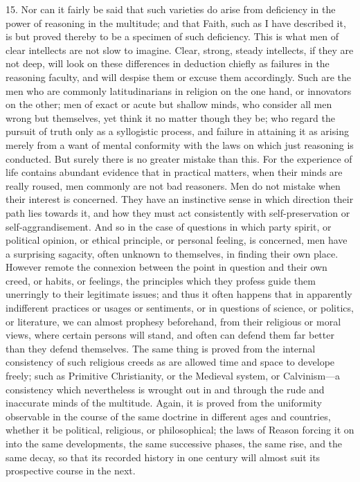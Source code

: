 15. Nor can it fairly be said that such varieties do arise from
deficiency in the power of reasoning in the multitude; and that Faith,
such as I have described it, is but proved thereby to be a specimen of
such deficiency. This is what men of clear intellects are not slow to
imagine. Clear, strong, steady intellects, if they are not deep, will
look on these differences in deduction chiefly as failures in the
reasoning faculty, and will despise them or excuse them accordingly.
Such are the men who are commonly latitudinarians in religion on the
one hand, or innovators on the other; men of exact or acute but
shallow minds, who consider all men wrong but themselves, yet think it
no matter though they be; who regard the pursuit of truth only as a
syllogistic process, and failure in attaining it as arising merely
from a want of mental conformity with the laws on which just reasoning
is conducted. But surely there is no greater mistake than this. For
the experience of life contains abundant evidence that in practical
matters, when their minds are really roused, men commonly are not bad
reasoners. Men do not mistake when their interest is concerned. They
have an instinctive sense in which direction their path lies towards
it, and how they must act consistently with self-preservation or self-aggrandisement.
And so in the case of questions in which party spirit, or political
opinion, or ethical principle, or personal feeling, is concerned, men
have a surprising sagacity, often unknown to themselves, in finding
their own place. However remote the connexion between the point in
question and their own creed, or habits, or feelings, the principles
which they profess guide them unerringly to their legitimate issues;
and thus it often happens that in apparently indifferent practices or
usages or sentiments, or in questions of science, or politics, or
literature, we can almost prophesy beforehand, from their religious or
moral views, where certain persons will stand, and often can defend
them far better than they defend themselves. The same thing is proved
from the internal consistency of such religious creeds as are allowed
time and space to develope freely; such as Primitive Christianity, or
the Medieval system, or Calvinism—a consistency which nevertheless
is wrought out in and through the rude and inaccurate minds of the
multitude. Again, it is proved from the uniformity observable in the
course of the same doctrine in different ages and countries, whether
it be political, religious, or philosophical; the laws of Reason
forcing it on into the same developments, the same successive phases,
the same rise, and the same decay, so that its recorded history in one
century will almost suit its prospective course in the next.

